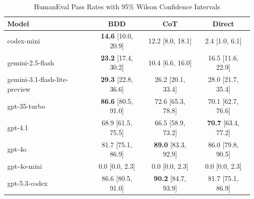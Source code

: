 \begin{table}[htbp]
\centering
\caption{HumanEval Pass Rates with 95\% Wilson Confidence Intervals}
\label{tab:humaneval_full}
\begin{tabular}{lccc}
\toprule
Model & BDD & CoT & Direct \\
\midrule
codex-mini & \textbf{14.6} [10.0, 20.9] & 12.2 [8.0, 18.1] & 2.4 [1.0, 6.1] \\
gemini-2.5-flash & \textbf{23.2} [17.4, 30.2] & 10.4 [6.6, 16.0] & 16.5 [11.6, 22.9] \\
gemini-3.1-flash-lite-preview & \textbf{29.3} [22.8, 36.6] & 26.2 [20.1, 33.4] & 28.0 [21.7, 35.4] \\
gpt-35-turbo & \textbf{86.6} [80.5, 91.0] & 72.6 [65.3, 78.8] & 70.1 [62.7, 76.6] \\
gpt-4.1 & 68.9 [61.5, 75.5] & 66.5 [58.9, 73.2] & \textbf{70.7} [63.4, 77.2] \\
gpt-4o & 81.7 [75.1, 86.9] & \textbf{89.0} [83.3, 92.9] & 86.0 [79.8, 90.5] \\
gpt-4o-mini & 0.0 [0.0, 2.3] & 0.0 [0.0, 2.3] & 0.0 [0.0, 2.3] \\
gpt-5.3-codex & 86.6 [80.5, 91.0] & \textbf{90.2} [84.7, 93.9] & 81.7 [75.1, 86.9] \\
\bottomrule
\end{tabular}
\end{table}